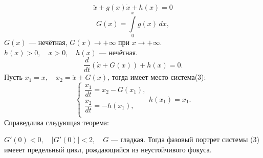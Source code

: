  	\clearpage
 	\[
 	\ddot x + g(x) \dot x + h(x) = 0
 	\]
 	\[
 	G(x) = \int \limits_0^x g(x) \, dx,
 	\]
 	\( G(x)\)  --- нечётная, \(G(x) \rightarrow +\infty\) при \(x  \rightarrow +\infty\).\\
 	\(h(x) > 0, \quad x > 0, \quad h(x)\) --- нечётная.\\
 	\[
 	\dfrac{d}{dt}(\dot x + G(x)) +h(x) =0.
 	\]
 	Пусть \(x_1 = x, \quad x_2 = \dot x + G(x)\), тогда имеет место система(3):
 	\[
 	\begin{cases}
 	\dfrac{x_1}{dt} = x_2 - G(x_1), \\
 	\dfrac{x_2}{dt} = -h(x_1),\\
 	\end{cases}
 	h(x_1) = x_1.
 	\]
 	Справедлива следующая теорема:
 	\begin{theorem}
 		\(G'(0) < 0, \quad |G'(0)|<2, \quad G\) --- гладкая. Тогда фазовый портрет системы (3) имееет предельный цикл, рождающийся из неустойчивого фокуса.
 	\end{theorem}
